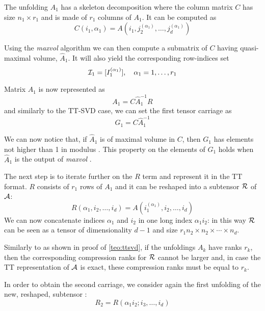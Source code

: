 The unfolding $A_1$ has a skeleton decomposition where the column matrix $C$ has size $n_1 \times r_1$ and is made of $r_1$ columns of $A_1$.
It can be computed as
\begin{equation*}
  C(i_1,\alpha_1) = A(i_1,j_2^{(\alpha_1)},\ldots,j_d^{(\alpha_1)})
\end{equation*}

Using the \emph{maxvol} algorithm we can then compute a submatrix of $C$ having quasi-maximal volume, $\hat{A}_1$. It will also yield the corresponding row-indices set
\begin{equation*}
  \mathcal{I}_1 = [I_1^{(\alpha_1)}], \quad \alpha_1 = 1,\ldots,r_1
\end{equation*}

Matrix $A_1$ is now represented as
\begin{equation*}
  A_1 = C\hat{A}_1^{-1}R
\end{equation*}
and similarly to the TT-SVD case, we can set the first tensor carriage as
\begin{equation*}
  G_1 = C\hat{A}_1^{-1}
\end{equation*}

We can now notice that, if $\hat{A}_1$ is of maximal volume in $C$, then $G_1$ has elements not higher than 1 in modulus . This property on the elements of $G_1$ holds when $\hat{A}_1$ is the output of \emph{maxvol} .

The next step is to iterate further on the $R$ term and represent it in the TT format. $R$ consists of $r_1$ rows of $A_1$ and it can be reshaped into a subtensor $\mathcal{R}$ of $\mathcal{A}$:
\begin{equation*}
  R(\alpha_1,i_2,\ldots,i_d) = A(i_1^{(\alpha_1)},i_2,\ldots,i_d)
\end{equation*}
We can now concatenate indices $\alpha_1$ and $i_2$ in one long index $\alpha_1i_2$: in this way $\mathcal{R}$ can be seen as a tensor of dimensionality $d-1$ and size $r_1n_2 \times n_2 \times \cdots \times n_d$.

Similarly to as shown in proof of \ref{teo:ttsvd}, if the unfoldings $A_k$ have ranks $r_k$, then the corresponding compression ranks for $\mathcal{R}$ cannot be larger and, in case the TT representation of $\mathcal{A}$ is exact, these compression ranks must be equal to $r_k$.

In order to obtain the second carriage, we consider again the first unfolding of the new, reshaped, subtensor :
\begin{equation*}
  R_2 = R(\alpha_1i_2;i_3,\ldots,i_d)
\end{equation*}

